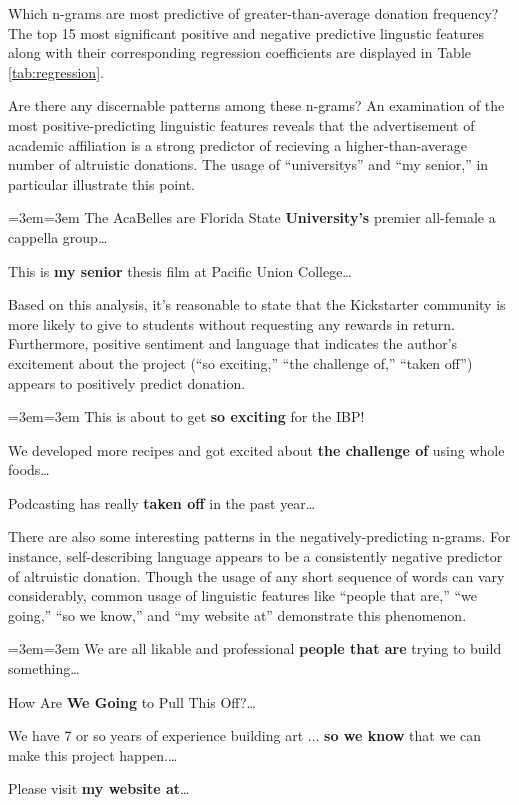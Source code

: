 \documentclass[letterpaper]{article}
\newenvironment{blockquote}{%
  \setlength{\parskip}{.5em}
  \par%
  \small
  \medskip
  \leftskip=3em\rightskip=3em%
  \noindent\ignorespaces}{%
  \par\medskip}
\begin{document}
Which n-grams are most predictive of greater-than-average donation frequency? The top 15 most significant positive and negative predictive lingustic features along with their corresponding regression coefficients are displayed in Table \ref{tab:regression}.

Are there any discernable patterns among these n-grams? An examination of the most positive-predicting linguistic features reveals that the advertisement of academic affiliation is a strong predictor of recieving a higher-than-average number of altruistic donations. The usage of ``universitys'' and ``my senior,'' in particular illustrate this point.
\begin{blockquote}
The AcaBelles are Florida State \textbf{University's} premier all-female a cappella group\ldots\par\noindent
This is \textbf{my senior} thesis film at Pacific Union College\ldots\par\noindent
\end{blockquote}
Based on this analysis, it's reasonable to state that the Kickstarter community is more likely to give to students without requesting any rewards in return.
Furthermore, positive sentiment and language that indicates the author's excitement about the project (``so exciting,'' ``the challenge of,'' ``taken off'') appears to positively predict donation.
\begin{blockquote}
This is about to get \textbf{so exciting} for the IBP! \par\noindent
We developed more recipes and got excited about \textbf{the challenge of} using whole foods\ldots\par\noindent
Podcasting has really \textbf{taken off} in the past year\ldots
\end{blockquote}
There are also some interesting patterns in the negatively-predicting n-grams. For instance, self-describing language appears to be a consistently negative predictor of altruistic donation. Though the usage of any short sequence of words can vary considerably, common usage of linguistic features like ``people that are,'' ``we going,'' ``so we know,'' and ``my website at'' demonstrate this phenomenon.
\begin{blockquote}
We are all likable and professional \textbf{people that are} trying to build something\ldots\par\noindent
How Are \textbf{We Going} to Pull This Off?\ldots\par\noindent
We have 7 or so years of experience building art ... \textbf{so we know} that we can make this project happen.\ldots\par\noindent
Please visit \textbf{my website at}\ldots
\end{blockquote}
\end{document}
